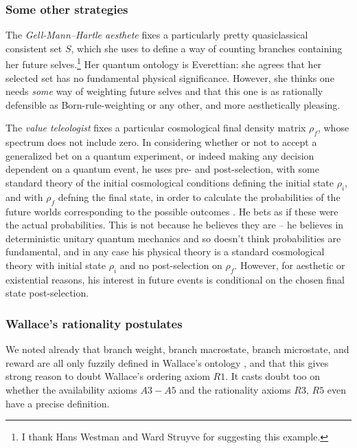 \documentclass[aps,
pra,epsfig,12pt,nofootinbib]{revtex4}
\begin{document}
\subsubsection{Some other strategies}

The {\it Gell-Mann--Hartle aesthete} fixes a particularly pretty 
quasiclassical consistent set $S$, which she uses to define a way 
of counting branches containing
her future selves.\footnote{I thank Hans Westman and Ward Struyve for
suggesting this example.}  Her quantum ontology is Everettian: she
agrees that her selected set has no fundamental physical significance.  
However, she thinks one needs {\it some} way of 
weighting future selves and that this one is as rationally
defensible as Born-rule-weighting or any other, and more aesthetically 
pleasing. 

The {\it value teleologist} fixes
a particular cosmological final density matrix $\rho_f$, whose
spectrum does not include zero.
In considering whether or not to accept a generalized bet on
a quantum experiment, or indeed making any decision dependent on a
quantum event, he uses pre- and post-selection, with some standard
theory of the initial cosmological conditions defining the initial
state $\rho_i$, and with $\rho_f$ defning the final state, in order to 
calculate the probabilities of the future worlds corresponding to the
possible outcomes \cite{aharonovetal, gmhtwotime}  .
He bets as if these were the actual probabilities.  This is not because 
he believes they are -- he believes in deterministic
unitary quantum mechanics and so doesn't think probabilities are
fundamental, and in any case
his physical theory is a standard cosmological theory with 
initial state $\rho_i$ and no post-selection on $\rho_f$.
However, for aesthetic or existential reasons, his interest in 
future events is conditional on the chosen final state post-selection.  

\subsubsection{Wallace's rationality postulates} 

We noted already that branch weight, branch macrostate, branch 
microstate, and reward are all only fuzzily defined in 
Wallace's ontology \cite{wallacevolone}, and that 
this gives strong reason to doubt Wallace's ordering axiom $R1$.   
It casts doubt too on whether the availability axioms $A3-A5$ and the 
rationality axioms $R3$, $R5$ even have a precise definition. 
\end{document}

